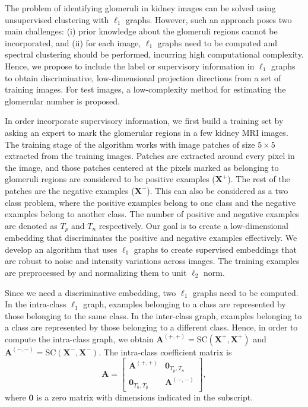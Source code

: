 The problem of identifying glomeruli in kidney images can be solved using unsupervised clustering with $\ell_1$ graphs. However, such an approach poses two main challenges: (i) prior knowledge about the glomeruli regions cannot be incorporated, and (ii) for each image, $\ell_1$ graphs need to be computed and spectral clustering should be performed, incurring high computational complexity. Hence, we propose to include the label or supervisory information in $\ell_1$ graphs to obtain discriminative, low-dimensional projection directions from a set of training images. For test images, a low-complexity method for estimating the glomerular number is proposed.

In order incorporate supervisory information, we first build a training set by asking an expert to mark the glomerular regions in a few kidney MRI images. The training stage of the algorithm works with image patches of size $5 \times 5$ extracted from the training images. Patches are extracted around every pixel in the image, and those patches centered at the pixels marked as belonging to glomeruli regions are considered to be positive examples ($\mathbf{X}^{+}$). The rest of the patches are the negative examples ($\mathbf{X}^{-}$). This can also be considered as a two class problem, where the positive examples belong to one class and the negative examples belong to another class. The number of positive and negative examples are denoted as $T_p$ and $T_n$ respectively. Our goal is to create a low-dimensional embedding that discriminates the positive and negative examples effectively. We develop an algorithm that uses $\ell_1$ graphs to create supervised embeddings that are robust to noise and intensity variations across images. The training examples are preprocessed by and normalizing them to unit $\ell_2$ norm.

Since we need a discriminative embedding, two $\ell_1$ graphs need to be computed. In the intra-class $\ell_1$ graph, examples belonging to a class are represented by those belonging to the same class. In the inter-class graph, examples belonging to a class are represented by those belonging to a different class. Hence, in order to compute the intra-class graph, we obtain $\mathbf{A}^{(+,+)} =  \text{SC}(\mathbf{X}^{+},\mathbf{X}^{+})$ and $\mathbf{A}^{(-,-)} =  \text{SC}(\mathbf{X}^{-},\mathbf{X}^{-})$. The intra-class coefficient matrix is
\begin{equation}
\mathbf{A} = 
\begin{bmatrix}
\mathbf{A}^{(+,+)} & \mathbf{0}_{T_p,T_n} \\
\mathbf{0}_{T_n,T_p} & \mathbf{A}^{(-,-)}
\end{bmatrix},
\label{eqn:propwc}
\end{equation} where $\mathbf{0}$ is a zero matrix with dimensions indicated in the subscript.

